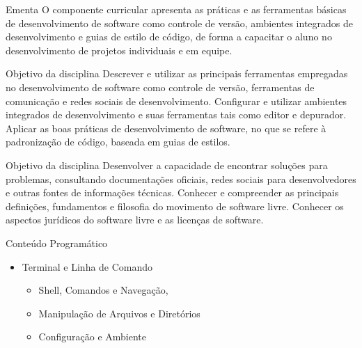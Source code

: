 \documentclass{beamer}
\begin{document}
\begin{frame}{Ementa}\justifying
      O componente curricular apresenta as práticas e as ferramentas básicas de
desenvolvimento de software como controle de versão, ambientes integrados de
desenvolvimento e guias de estilo de código, de forma a capacitar o aluno no
desenvolvimento de projetos individuais e em equipe.
\end{frame}

\begin{frame}{Objetivo da disciplina}\justifying
      Descrever e utilizar as principais ferramentas empregadas no desenvolvimento de software como controle de versão, ferramentas de comunicação e redes sociais de desenvolvimento. \newline
      \newline
      Configurar e utilizar ambientes integrados de desenvolvimento e suas ferramentas tais como editor e depurador.\newline
      \newline
      Aplicar as boas práticas de desenvolvimento de software, no que se refere à padronização de código, baseada em guias de estilos. 
\end{frame}

\begin{frame}{Objetivo da disciplina}\justifying
      Desenvolver a capacidade de encontrar soluções para problemas, consultando documentações oficiais, redes sociais para desenvolvedores e outras fontes de informações técnicas. \newline
      \newline
      Conhecer e compreender as principais definições, fundamentos e filosofia do movimento de software livre. Conhecer os aspectos jurídicos do software livre e as licenças de software.\newline
      \newline
\end{frame}

\begin{frame}{Conteúdo Programático}\justifying
      \begin{itemize}
            \item Terminal e Linha de Comando
                  \begin{itemize}
                        \item Shell, Comandos e Navegação,
                        \item Manipulação de Arquivos e Diretórios
                        \item Configuração e Ambiente
                  \end{itemize}
            
            
      \end{itemize}
\end{frame}
\end{document}
